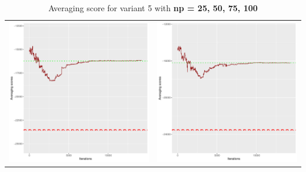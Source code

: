 \documentclass[]{scrartcl}
\begin{document}
\begin{table}[h!]
\begin{tabular}{cc}
\includegraphics[scale = 0.4]{./figs/win95pts/v5/75/avgBoundsEvolution-14252.pdf} & 
\includegraphics[scale = 0.4]{./figs/win95pts/v5/100/avgBoundsEvolution-14252.pdf} \\
\end{tabular}
\caption{Averaging score for variant 5 with \textbf{np =  25, 50, 75, 100 }}
\end{table}
\end{document}
